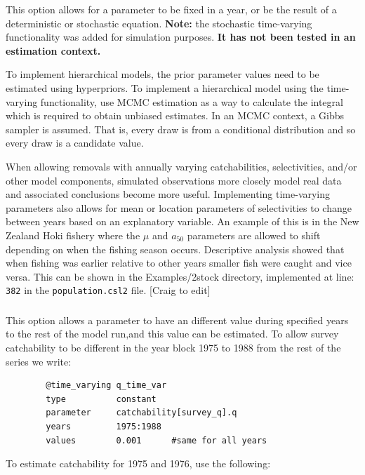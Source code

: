 This option allows for a parameter to be fixed in a year, or be the result of a deterministic or stochastic equation. \textbf{Note:} the stochastic time-varying functionality was added for simulation purposes. \textbf{It has not been tested in an estimation context.}

To implement hierarchical models, the prior parameter values need to be estimated using hyperpriors. To implement a hierarchical model using the time-varying functionality, use MCMC estimation as a way to calculate the integral which is required to obtain unbiased estimates. In an MCMC context, a Gibbs sampler is assumed. That is, every draw is from a conditional distribution and so every draw is a candidate value. 

When allowing removals with annually varying catchabilities, selectivities, and/or other model components, simulated observations more closely model real data and associated conclusions become more useful. Implementing time-varying parameters also allows for mean or location parameters of selectivities to change between years based on an explanatory variable. An example of this is in the New Zealand Hoki fishery where the $\mu$ and $a_{50}$ parameters are allowed to shift depending on when the fishing season occurs. Descriptive analysis showed that when fishing was earlier relative to other years smaller fish were caught and vice versa. This can be shown in the Examples/2stock directory, implemented at line: \texttt{382} in the \texttt{population.csl2} file. [Craig to edit]

\subsubsection[Constant (year blocks)]{}\label{sec:TimeVarying-Constant}

This option allows a parameter to have an different value during specified years to the rest of the model run,and this value can be estimated. To allow survey catchability to be different in the year block 1975 to 1988 from the rest of the series we write:

{\small{\begin{verbatim}
		@time_varying q_time_var
		type          constant
		parameter     catchability[survey_q].q
		years         1975:1988
		values        0.001      #same for all years
		\end{verbatim}}}

To estimate catchability for 1975 and 1976, use the following:

